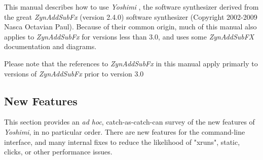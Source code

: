 \documentclass[
 11pt,
 twoside,
 a4paper,
 final                                 %
]{article}
\begin{document}
   This manual describes how to use \textsl{Yoshimi} \cite{yoshimi},
   the software synthesizer derived from the great
   \textsl{ZynAddSubFx} (version 2.4.0) \cite{zynaddsubfx} software
   synthesizer (Copyright 2002-2009 Nasca Octavian Paul).
   Because of their common origin, much of this manual also
   applies to \textsl{ZynAddSubFx} for versions less than 3.0,
   and uses some \textsl{ZynAddSubFX} documentation and diagrams.



   Please note that the references to \textsl{ZynAddSubFx}
   in this manual apply primarly to versions of \textsl{ZynAddSubFx}
   prior to version 3.0


\subsection{New Features}
\label{subsec:introduction_new_features}

   This section provides an \textsl{ad hoc}, catch-as-catch-can survey of the
   new features of \textsl{Yoshimi}, in no particular order.
   There are new features for the command-line interface, and many internal
   fixes to reduce the likelihood of "xruns", static, clicks, or other
   performance issues.
\end{document}
